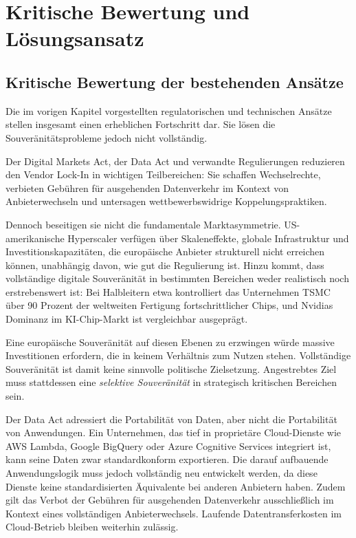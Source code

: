 \chapter{Kritische Bewertung und Lösungsansatz}

\section{Kritische Bewertung der bestehenden Ansätze}
\label{ch:kritische-bewertung}

Die im vorigen Kapitel vorgestellten regulatorischen und 
technischen Ansätze stellen insgesamt einen erheblichen 
Fortschritt dar. Sie lösen die Souveränitätsprobleme jedoch 
nicht vollständig.

Der Digital Markets Act, der Data Act und verwandte 
Regulierungen reduzieren den Vendor Lock-In in wichtigen 
Teilbereichen: Sie schaffen Wechselrechte, verbieten 
Gebühren für ausgehenden Datenverkehr im Kontext von Anbieterwechseln und 
untersagen wettbewerbswidrige Koppelungspraktiken. 

Dennoch beseitigen sie nicht die fundamentale 
Marktasymmetrie. US-amerikanische Hyperscaler verfügen 
über Skaleneffekte, globale Infrastruktur und 
Investitionskapazitäten, die europäische Anbieter 
strukturell nicht erreichen können, unabhängig davon, 
wie gut die Regulierung ist. Hinzu kommt, dass vollständige 
digitale Souveränität in bestimmten Bereichen weder 
realistisch noch erstrebenswert ist: Bei Halbleitern 
etwa kontrolliert das Unternehmen \ac{TSMC} über 90 Prozent der weltweiten 
Fertigung fortschrittlicher Chips, und Nvidias Dominanz 
im KI-Chip-Markt ist vergleichbar ausgeprägt.

Eine 
europäische Souveränität auf diesen Ebenen zu erzwingen 
würde massive Investitionen erfordern, die in keinem Verhältnis 
zum Nutzen stehen. Vollständige Souveränität ist damit 
keine sinnvolle politische Zielsetzung. Angestrebtes 
Ziel muss stattdessen eine \textit{selektive Souveränität} 
in strategisch kritischen Bereichen sein.

Der Data Act adressiert die Portabilität von Daten,
aber nicht die Portabilität von Anwendungen. Ein 
Unternehmen, das tief in proprietäre Cloud-Dienste 
wie AWS Lambda, Google BigQuery oder Azure Cognitive 
Services integriert ist, kann seine Daten zwar 
standardkonform exportieren. Die darauf aufbauende 
Anwendungslogik muss jedoch vollständig neu entwickelt 
werden, da diese Dienste keine standardisierten 
Äquivalente bei anderen Anbietern haben. Zudem gilt 
das Verbot der Gebühren für ausgehenden Datenverkehr ausschließlich im Kontext eines 
vollständigen Anbieterwechsels. Laufende 
Datentransferkosten im Cloud-Betrieb bleiben weiterhin 
zulässig.

